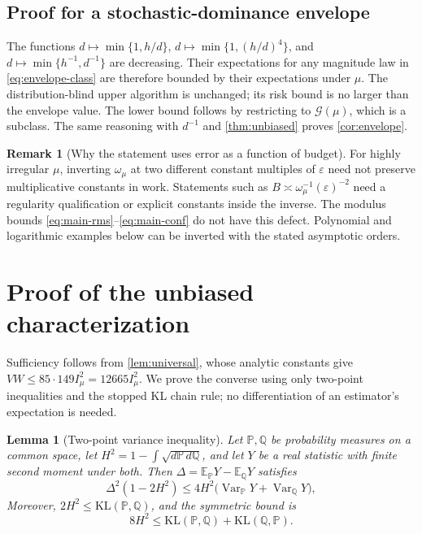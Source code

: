 \documentclass[11pt,a4paper]{article}
\newtheorem{lemma}[theorem]{Lemma}
\theoremstyle{definition}
\newtheorem{remark}[theorem]{Remark}
\newcommand{\cG}{\mathcal G}
\newcommand{\om}{\omega_\mu}
\begin{document}
\subsection{Proof for a stochastic-dominance envelope}
The functions $d\mapsto\min\{1,h/d\}$,
$d\mapsto\min\{1,(h/d)^4\}$, and
$d\mapsto\min\{h^{-1},d^{-1}\}$ are decreasing. Their expectations for
any magnitude law in \eqref{eq:envelope-class} are therefore bounded by
their expectations under $\mu$. The distribution-blind upper algorithm is unchanged; its risk bound is
no larger than the envelope value. The lower bound follows by restricting to
$\cG(\mu)$, which is a subclass. The same reasoning with $d^{-1}$ and
\cref{thm:unbiased} proves \cref{cor:envelope}.

\begin{remark}[Why the statement uses error as a function of budget]
For highly irregular $\mu$, inverting $\om$ at two different constant
multiples of $\varepsilon$ need not preserve multiplicative constants in
work. Statements such as $B\asymp\om^{-1}(\varepsilon)^{-2}$ need a
regularity qualification or explicit constants inside the inverse.
The modulus bounds \eqref{eq:main-rms}--\eqref{eq:main-conf} do not have
this defect. Polynomial and logarithmic examples below can be inverted
with the stated asymptotic orders.
\end{remark}

\section{Proof of the unbiased characterization}\label{sec:unbiased-proof}
Sufficiency follows from \cref{lem:universal}, whose analytic constants give
$VW\le85\cdot149 I_\mu^2=12665I_\mu^2$.
We prove the converse using only two-point inequalities and the stopped
KL chain rule; no differentiation of an estimator's expectation is needed.

\begin{lemma}[Two-point variance inequality]\label{lem:hellinger-variance}
Let $\mathbb{P},\mathbb{Q}$ be probability measures on a common space, let
$H^2=1-\int\sqrt{d\mathbb{P}\,d\mathbb{Q}}$, and let $Y$ be a real statistic with finite second moment
under both. Then $\Delta=\mathbb{E}_{\mathbb{P}}Y-\mathbb{E}_{\mathbb{Q}}Y$ satisfies
\begin{equation}\label{eq:hellinger-variance}
\Delta^2(1-2H^2)\le4H^2\bigl(\operatorname{Var}_{\mathbb{P}}Y+\operatorname{Var}_{\mathbb{Q}}Y\bigr),
\end{equation}
Moreover, $2H^2\le\mathrm{KL}(\mathbb{P},\mathbb{Q})$, and the symmetric bound is
\begin{equation}\label{eq:symmetric-kl-hellinger}
8H^2\le\mathrm{KL}(\mathbb{P},\mathbb{Q})+\mathrm{KL}(\mathbb{Q},\mathbb{P}).
\end{equation}
\end{lemma}
\end{document}
